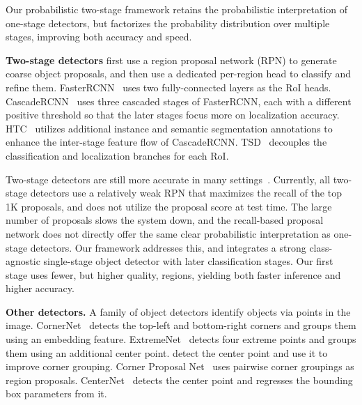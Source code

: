 \documentclass{article}
\begin{document}
Our probabilistic two-stage framework retains the probabilistic interpretation of one-stage detectors, but factorizes the probability distribution over multiple stages, improving both accuracy and speed.

\noindent \textbf{Two-stage detectors}
first use a region proposal network (RPN) to generate coarse object proposals, and then use a dedicated per-region head to classify and refine them.
FasterRCNN~\cite{ren2015faster,he2017mask} uses two fully-connected layers as the RoI heads.
CascadeRCNN~\cite{cai2018cascade} uses three cascaded stages of FasterRCNN, each with a different positive threshold so that the later stages focus more on localization accuracy.
HTC~\cite{chen2019hybrid} utilizes additional instance and semantic segmentation annotations to enhance the inter-stage feature flow of CascadeRCNN.
TSD~\cite{song2020revisiting} decouples the classification and localization branches for each RoI.

Two-stage detectors are still more accurate in many settings~\cite{gupta2019lvis,sun2019scalability,kuznetsova2018open}.
Currently, all two-stage detectors use a relatively weak RPN that maximizes the recall of the top 1K proposals, and does not utilize the proposal score at test time.
The large number of proposals slows the system down, and the recall-based proposal network does not directly offer the same clear probabilistic interpretation as one-stage detectors.
Our framework addresses this, and integrates a strong class-agnostic single-stage object detector with later classification stages.
Our first stage uses fewer, but higher quality, regions, yielding both faster inference and higher accuracy.

\noindent \textbf{Other detectors.}
A family of object detectors identify objects via points in the image.
CornerNet~\cite{Law_2018_ECCV} detects the top-left and bottom-right corners and groups them using an embedding feature.
ExtremeNet~\cite{zhou2019bottomup} detects four extreme points and groups them using an additional center point.
\citet{duan2019centernet} detect the center point and use it to improve corner grouping.
Corner Proposal Net~\cite{duan2020corner} uses pairwise corner groupings as region proposals. CenterNet~\cite{zhou2019objects} detects the center point and regresses the bounding box parameters from it.
\end{document}
